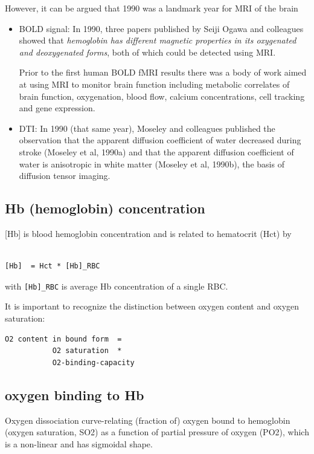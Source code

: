 


However, it can be argued that 1990 was a landmark year for MRI of the brain
\begin{itemize}
  
  \item BOLD signal: In 1990, three papers published by Seiji Ogawa and
  colleagues showed that {\it hemoglobin has different magnetic properties in
  its oxygenated and deoxygenated forms}, both of which could be detected using
  MRI.
  
Prior to the first human BOLD fMRI results there was a body of work aimed at
using MRI to monitor brain function including metabolic correlates of brain
function, oxygenation, blood flow, calcium concentrations, cell tracking and
gene expression.
  
  \item DTI:  In 1990 (that same year), Moseley and colleagues published the
  observation that the apparent diffusion coefficient of water decreased during
  stroke (Moseley et al, 1990a) and that the apparent diffusion coefficient of
  water is anisotropic in white matter (Moseley et al, 1990b), the basis of
  diffusion tensor imaging.
  
\end{itemize}


\subsection{Hb (hemoglobin) concentration}
\label{sec:BOLD_Hb}

[Hb] is blood hemoglobin concentration and is related to hematocrit (Hct) by 
\begin{verbatim}

[Hb]  = Hct * [Hb]_RBC
\end{verbatim}
with \verb![Hb]_RBC! is average Hb concentration of a single RBC.

It is important to recognize the distinction between oxygen content and oxygen
saturation: 
\begin{verbatim}
O2 content in bound form  =  
           O2 saturation  *
           O2-binding-capacity
\end{verbatim}


\subsection{oxygen binding to Hb}

Oxygen dissociation curve-relating (fraction of) oxygen bound to hemoglobin
(oxygen saturation, SO2) as a function of partial pressure of oxygen (PO2),
which is a non-linear and has sigmoidal shape.

